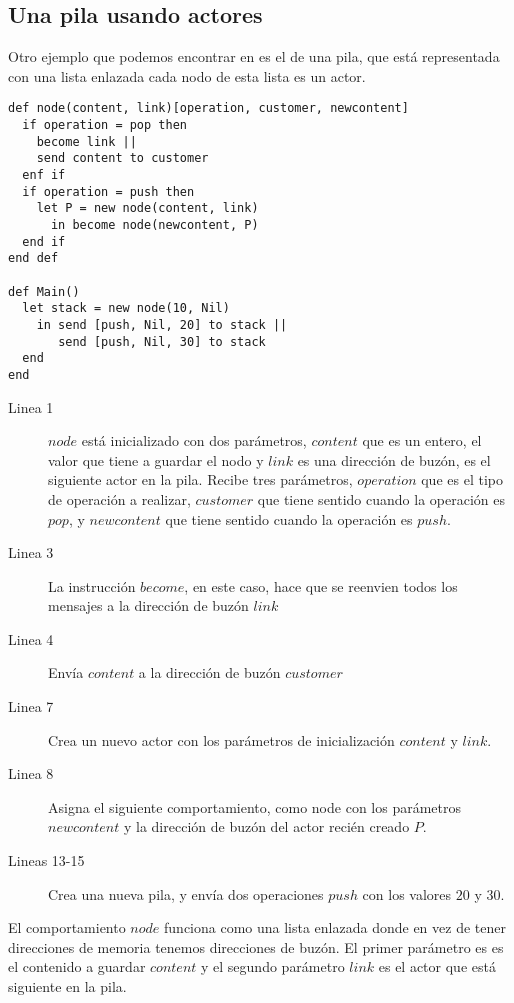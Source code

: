 \subsection{Una pila usando actores}

Otro ejemplo que podemos encontrar en \cite{Agha:1986:AMC:7929} es el de una pila,
que está representada con una lista enlazada cada nodo de esta lista es un actor. 

\begin{lstlisting}[language=sal, style=simple]
def node(content, link)[operation, customer, newcontent]
  if operation = pop then
    become link ||
    send content to customer
  enf if
  if operation = push then
    let P = new node(content, link)
      in become node(newcontent, P) 
  end if
end def

def Main() 
  let stack = new node(10, Nil)
    in send [push, Nil, 20] to stack ||
       send [push, Nil, 30] to stack
  end
end
\end{lstlisting}

\begin{description}

\item [Linea 1] $node$ está inicializado con dos parámetros, $content$ que es un entero, el valor que tiene a guardar el nodo y  $link$ es una dirección de buzón, es el siguiente actor en la pila. Recibe tres parámetros, $operation$ que es el tipo de operación a realizar,  $customer$ que tiene sentido cuando la operación es $pop$, y $newcontent$ que tiene sentido cuando la operación es $push$.
\item [Linea 3] La instrucción $become$, en este caso, hace que se reenvien todos los mensajes a la dirección de buzón $link$
\item [Linea 4] Envía $content$ a la dirección de buzón $customer$
\item [Linea 7] Crea un nuevo actor con los parámetros de inicialización $content$ y $link$.
\item [Linea 8] Asigna el siguiente comportamiento, como node con los parámetros $newcontent$ y la dirección de buzón del actor recién creado $P$. 
\item [Lineas 13-15] Crea una nueva pila, y envía dos operaciones $push$ con los valores $20$ y $30$.
\end{description}

El comportamiento $node$ funciona como una lista enlazada donde en vez de tener direcciones de memoria tenemos direcciones de buzón. El primer parámetro es es el contenido a guardar $content$ y el segundo parámetro $link$ es el actor que está siguiente en la pila.

